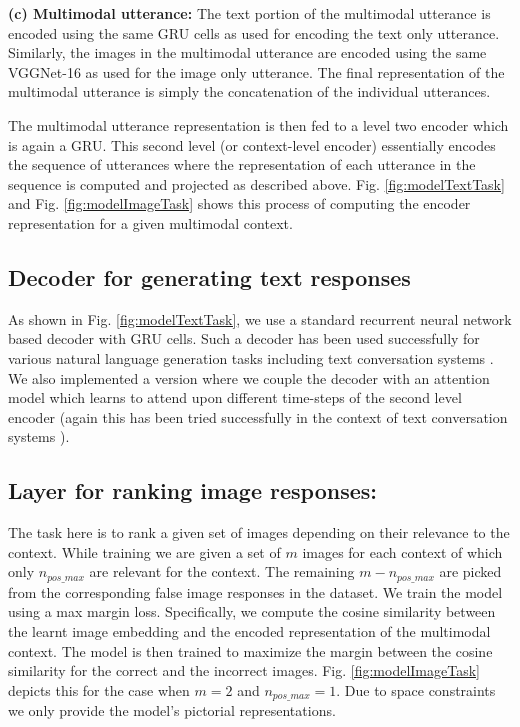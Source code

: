 \documentclass[letterpaper]{article} %
\begin{document}
\noindent \textbf{(c) Multimodal utterance:} The text portion of the multimodal utterance is encoded using the same GRU cells as used for encoding the text only utterance. Similarly, the images in the multimodal utterance are encoded using the same VGGNet-16 as used for the image only utterance. The final representation of the multimodal utterance is simply the concatenation of the individual utterances.

The multimodal utterance representation is then fed to a level two encoder which is again a GRU. This second level (or context-level encoder) essentially encodes the sequence of utterances where the representation of each utterance in the sequence is computed and projected as described above. Fig. \ref{fig:modelTextTask} and Fig. \ref{fig:modelImageTask} shows this process of computing the encoder representation for a given multimodal context.

\subsection{Decoder for generating text responses}
As shown in Fig. \ref{fig:modelTextTask}, we use a standard recurrent neural network based decoder with GRU cells. Such a decoder has been used successfully for various natural language generation tasks including text conversation systems \cite{DBLP:journals/corr/SerbanSLCPCB16}. We also implemented a version where we couple the decoder with an attention model which learns to attend upon different time-steps of the second level encoder (again this has been tried successfully in the context of text conversation systems \cite{DBLP:journals/corr/YaoPZW16}).

\subsection{Layer for ranking image responses:} The task here is to rank a given set of images depending on their relevance to the context. While training we are given a set of $m$ images for each context of which only $n_{pos\_max}$ are relevant for the context. The remaining $m - n_{pos\_max}$ are picked from the corresponding false image responses in the dataset. 
We train the model using a max margin loss. Specifically, we compute the cosine similarity between the learnt image embedding and the encoded representation of the multimodal context. The model is then trained to maximize the margin between the cosine similarity for the correct and the incorrect images. Fig. \ref{fig:modelImageTask} depicts this for the case when $m = 2$ and $n_{pos\_max} = 1$. Due to space constraints we only provide the model's pictorial representations.   
\end{document}

